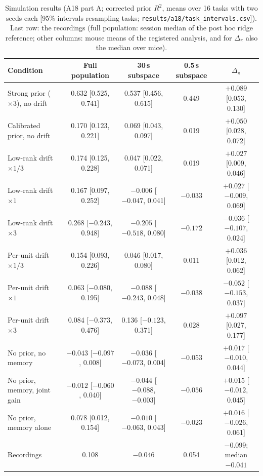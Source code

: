\documentclass{article}
\begin{document}
\begin{table}[H]
  \setlength{\tabcolsep}{3pt}
  \caption{Simulation results (A18 part A; corrected prior $R^2$, means over 16 tasks with two seeds each [95\%
  intervals resampling tasks; \texttt{results/a18/task\_intervals.csv}]). Last row: the recordings (full population:
  session median of the post hoc ridge reference; other columns: mouse means of the registered analysis, and for
  $\Delta_\pi$ also the median over mice).}
  \label{tab:simfull}
  \centering\scriptsize
  \begin{tabular}{lcccc}
    \toprule
    Condition & Full population & 30\,s subspace & 0.5\,s subspace & $\Delta_\pi$ \\
    \midrule
    Strong prior ($\times 3$), no drift & 0.632 [0.525, 0.741] & 0.537 [0.456, 0.615] & 0.449 & $+0.089$ [0.053, 0.130] \\
    Calibrated prior, no drift & 0.170 [0.123, 0.221] & 0.069 [0.043, 0.097] & 0.019 & $+0.050$ [0.028, 0.072] \\
    Low-rank drift $\times 1/3$ & 0.174 [0.125, 0.228] & 0.047 [0.022, 0.071] & 0.019 & $+0.027$ [0.009, 0.046] \\
    Low-rank drift $\times 1$ & 0.167 [0.097, 0.252] & $-0.006$ [$-0.047$, 0.041] & $-0.033$ & $+0.027$ [$-0.009$, 0.069] \\
    Low-rank drift $\times 3$ & 0.268 [$-0.243$, 0.948] & $-0.205$ [$-0.518$, 0.080] & $-0.172$ & $-0.036$ [$-0.107$, 0.024] \\
    Per-unit drift $\times 1/3$ & 0.154 [0.093, 0.226] & 0.046 [0.017, 0.080] & 0.011 & $+0.036$ [0.012, 0.062] \\
    Per-unit drift $\times 1$ & 0.063 [$-0.080$, 0.195] & $-0.088$ [$-0.243$, 0.048] & $-0.038$ & $-0.052$ [$-0.153$, 0.037] \\
    Per-unit drift $\times 3$ & 0.084 [$-0.373$, 0.476] & 0.136 [$-0.123$, 0.371] & 0.028 & $+0.097$ [0.027, 0.177] \\
    No prior, no memory & $-0.043$ [$-0.097$, 0.008] & $-0.036$ [$-0.073$, 0.004] & $-0.053$ & $+0.017$ [$-0.010$, 0.044] \\
    No prior, memory, joint gain & $-0.012$ [$-0.060$, 0.040] & $-0.044$ [$-0.088$, $-0.003$] & $-0.056$ & $+0.015$ [$-0.012$, 0.045] \\
    No prior, memory alone & 0.078 [0.012, 0.154] & $-0.010$ [$-0.063$, 0.043] & $-0.023$ & $+0.016$ [$-0.026$, 0.061] \\
    \midrule
    Recordings & 0.108 & $-0.046$ & 0.054 & $-0.099$; median $-0.041$ \\
    \bottomrule
  \end{tabular}
\end{table}
\end{document}
